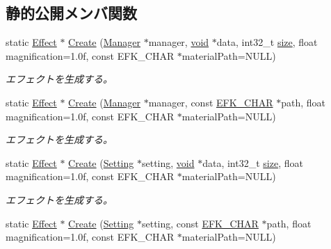 \subsection*{静的公開メンバ関数}
\begin{DoxyCompactItemize}
\item 
static \mbox{\hyperlink{class_effekseer_1_1_effect}{Effect}} $\ast$ \mbox{\hyperlink{class_effekseer_1_1_effect_a405ce55b658846f21963f39d8f4bda12}{Create}} (\mbox{\hyperlink{class_effekseer_1_1_manager}{Manager}} $\ast$manager, \mbox{\hyperlink{namespace_effekseer_ab34c4088e512200cf4c2716f168deb56}{void}} $\ast$data, int32\+\_\+t \mbox{\hyperlink{namespace_effekseer_a73c68f3d33539d30844b9d1e058077f7}{size}}, float magnification=1.\+0f, const E\+F\+K\+\_\+\+C\+H\+A\+R $\ast$material\+Path=\+N\+U\+L\+L)
\begin{DoxyCompactList}\small\item\em エフェクトを生成する。 \end{DoxyCompactList}\item 
static \mbox{\hyperlink{class_effekseer_1_1_effect}{Effect}} $\ast$ \mbox{\hyperlink{class_effekseer_1_1_effect_ace21c8a6f826d2ddd167b582a996f0b7}{Create}} (\mbox{\hyperlink{class_effekseer_1_1_manager}{Manager}} $\ast$manager, const \mbox{\hyperlink{_effekseer_8h_a50b026abea014b47854bcd835b3b6233}{E\+F\+K\+\_\+\+C\+H\+AR}} $\ast$path, float magnification=1.\+0f, const E\+F\+K\+\_\+\+C\+H\+A\+R $\ast$material\+Path=\+N\+U\+L\+L)
\begin{DoxyCompactList}\small\item\em エフェクトを生成する。 \end{DoxyCompactList}\item 
static \mbox{\hyperlink{class_effekseer_1_1_effect}{Effect}} $\ast$ \mbox{\hyperlink{class_effekseer_1_1_effect_adc51450e8263a3d2dacfa361ec6526f2}{Create}} (\mbox{\hyperlink{class_effekseer_1_1_setting}{Setting}} $\ast$setting, \mbox{\hyperlink{namespace_effekseer_ab34c4088e512200cf4c2716f168deb56}{void}} $\ast$data, int32\+\_\+t \mbox{\hyperlink{namespace_effekseer_a73c68f3d33539d30844b9d1e058077f7}{size}}, float magnification=1.\+0f, const E\+F\+K\+\_\+\+C\+H\+A\+R $\ast$material\+Path=\+N\+U\+L\+L)
\begin{DoxyCompactList}\small\item\em エフェクトを生成する。 \end{DoxyCompactList}\item 
static \mbox{\hyperlink{class_effekseer_1_1_effect}{Effect}} $\ast$ \mbox{\hyperlink{class_effekseer_1_1_effect_ac2d94c1b993a8ff1a6fe5b53a86b7965}{Create}} (\mbox{\hyperlink{class_effekseer_1_1_setting}{Setting}} $\ast$setting, const \mbox{\hyperlink{_effekseer_8h_a50b026abea014b47854bcd835b3b6233}{E\+F\+K\+\_\+\+C\+H\+AR}} $\ast$path, float magnification=1.\+0f, const E\+F\+K\+\_\+\+C\+H\+A\+R $\ast$material\+Path=\+N\+U\+L\+L)

\end{DoxyCompactItemize}
